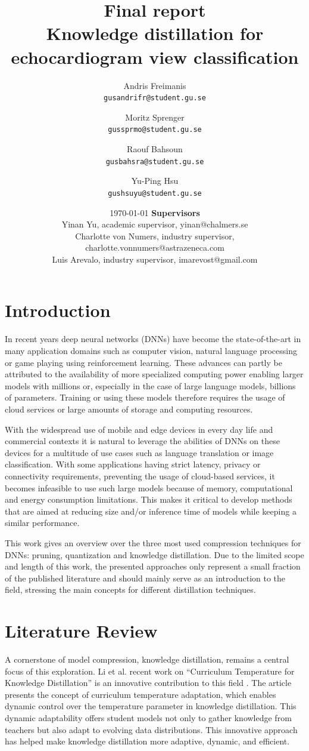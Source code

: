 \documentclass{article}
\title{Final report \\ Knowledge distillation for echocardiogram view classification}
\author{
  Andris Freimanis\\
  \texttt{gusandrifr@student.gu.se}
  \and
  Moritz Sprenger\\
  \texttt{gussprmo@student.gu.se}
  \and
  Raouf Bahsoun\\
  \texttt{gusbahsra@student.gu.se}
  \and
  Yu-Ping Hsu\\
  \texttt{gushsuyu@student.gu.se}
}
\date{\today \endgraf\bigskip\vspace*{12cm}
	\textbf{Supervisors}\\
	\centering Yinan Yu, academic supervisor, yinan@chalmers.se \\
	Charlotte von Numers, industry supervisor, charlotte.vonnumers@astrazeneca.com \\
	Luis Arevalo, industry supervisor, imarevost@gmail.com}
\begin{document}
\maketitle

\newpage
\tableofcontents
\newpage
\section{Introduction}
In recent years deep neural networks (DNNs) have become the state-of-the-art in many application domains such as computer vision, natural language processing or game playing using reinforcement learning. These advances can partly be attributed to the availability of more specialized computing power enabling larger models with millions or, especially in the case of large language models, billions of parameters. Training or using these models therefore requires the usage of cloud services or large amounts of storage and computing resources.

With the widespread use of mobile and edge devices in every day life and commercial contexts it is natural to leverage the abilities of DNNs on these devices for a multitude of use cases such as language translation or image classification. With some applications having strict latency, privacy or connectivity requirements, preventing the usage of cloud-based services, it becomes infeasible to use such large models because of memory, computational and energy consumption limitations. This makes it critical to develop methods that are aimed at reducing size and/or inference time of models while keeping a similar performance.

This work gives an overview over the three most used compression techniques for DNNs: pruning, quantization and knowledge distillation. Due to the limited scope and length of this work, the presented approaches only represent a small fraction of the published literature and should mainly serve as an introduction to the field, stressing the main concepts for different distillation techniques.
\newpage
\section{Literature Review}
A cornerstone of model compression, knowledge distillation, remains a central focus of this exploration. Li et al. recent work on “Curriculum Temperature for Knowledge Distillation” is an innovative contribution to this field \cite{li2023curriculum}. The article presents the concept of curriculum temperature adaptation, which enables dynamic control over the temperature parameter in knowledge distillation. This dynamic adaptability offers student models not only to gather knowledge from teachers but also adapt to evolving data distributions. This innovative approach has helped make knowledge distillation more adaptive, dynamic, and efficient.
\end{document}
